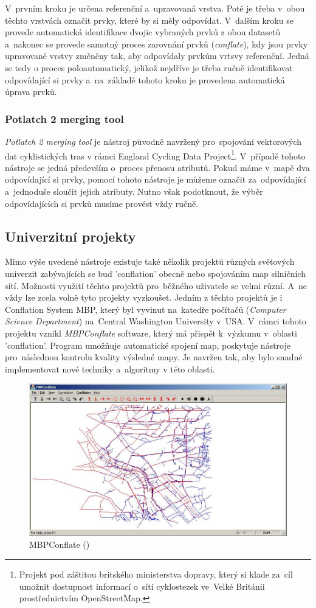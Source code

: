 V~prvním kroku je určena referenční a~upravovaná vrstva. Poté je třeba v~obou těchto vrstvách označit prvky, které by si měly odpovídat. V~dalším kroku se provede automatická
identifikace dvojic vybraných prvků z obou datasetů a~nakonec se provede samotný proces zarovnání prvků (\textit{conflate}), kdy jsou prvky upravované vrstvy změněny tak, 
aby odpovídaly prvkům vrtsvy referenční. Jedná se tedy o proces poloautomatický, jelikož nejdříve je třeba ručně identifikovat odpovídající si prvky a~na~základě tohoto kroku 
je provedena automatická úprava prvků.


\subsubsection{Potlatch 2 merging tool}

\textit{Potlatch 2 merging tool} je nástroj původně navržený pro~spojování vektorových dat cyklistických tras v rámci England Cycling Data Project\footnote{Projekt pod záštitou
britského ministerstva dopravy, který si klade za~cíl umožnit dostupnost informací o~síti cyklostezek  ve~Velké Británii prostřednictvím OpenStreetMap.}. %
V~případě tohoto nástroje se jedná především o~proces přenosu atributů. Pokud máme v~mapě dva odpovídající si prvky, pomocí tohoto nástroje je můžeme označit za~odpovídající
a~jednoduše sloučit jejich atributy. Nutno však podotknout, že výběr odpovídajících si prvků musíme provést vždy ručně. 


\subsection{Univerzitní projekty}
\label{univerzitní}

Mimo výše uvedené nástroje existuje také několik projektů různých světových univerzit zabývajících se buď 'conflation' obecně nebo spojováním map silničních sítí. Možnosti
využití těchto projektů pro~běžného uživatele se velmi různí. A~ne vždy lze zcela volně tyto projekty vyzkoušet. Jedním z těchto projektů je i Conflation System MBP, který
byl vyvinut na~katedře počítačů (\textit{Computer Science Department}) na~Central Washington University v~USA. V~rámci tohoto projektu vznikl \textit{MBPConflate} software,
který má přispět k~výzkumu v~oblasti 'conflation'. Program umožňuje automatické spojení map, poskytuje nástroje pro~následnou kontrolu kvali\-ty výsledné mapy.
Je navržen tak, aby bylo snadné implementovat nové techniky a~algoritmy v této oblasti.  

\label{mbppic}
  \begin{figure}[hbt]
    \centering
      \includegraphics[width=350pt]{./pictures/MBPconflate.png}
      \caption{MBPConflate ()}
      \label{fig:mbp}
  \end{figure}
